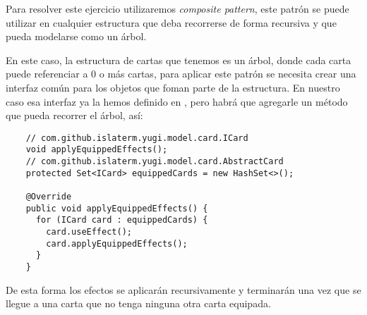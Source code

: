\begin{Answer}[ref=ex:composite-1]
  Para resolver este ejercicio utilizaremos \textit{composite pattern}, este patrón se 
  puede utilizar en cualquier estructura que deba recorrerse de forma recursiva y que 
  pueda modelarse como un árbol.
  
  En este caso, la estructura de cartas que tenemos es un árbol, donde cada carta puede 
  referenciar a 0 o más cartas, para aplicar este patrón se necesita crear una interfaz 
  común para los objetos que foman parte de la estructura.
  En nuestro caso esa interfaz ya la hemos definido en , pero habrá que 
  agregarle un método que pueda recorrer el árbol, así:

  \begin{verbatim}
    // com.github.islaterm.yugi.model.card.ICard
    void applyEquippedEffects();
    // com.github.islaterm.yugi.model.card.AbstractCard
    protected Set<ICard> equippedCards = new HashSet<>();

    @Override
    public void applyEquippedEffects() {
      for (ICard card : equippedCards) {
        card.useEffect();
        card.applyEquippedEffects();
      }
    }
  \end{verbatim}

  De esta forma los efectos se aplicarán recursivamente y terminarán una vez que se llegue
  a una carta que no tenga ninguna otra carta equipada. 
\end{Answer}
%